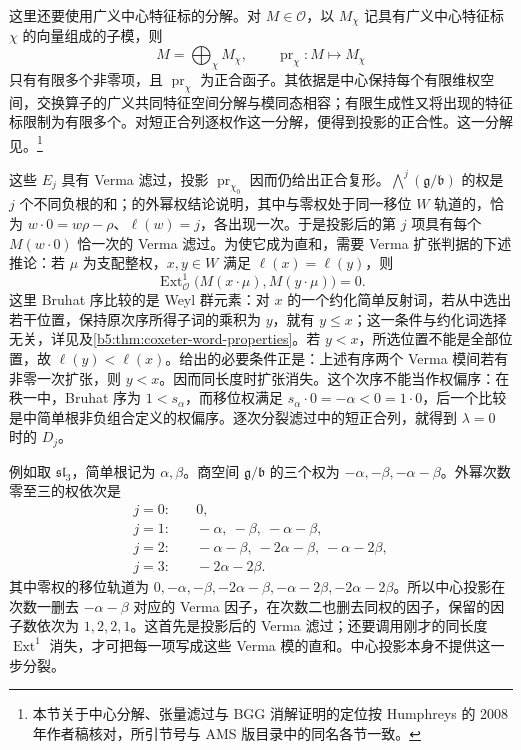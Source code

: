 \begin{proofsketch}
	这里还要使用广义中心特征标的分解。对 \(M\in\mathcal O\)，以 \(M_\chi\) 记具有广义中心特征标 \(\chi\) 的向量组成的子模，则
	\[
		M=\bigoplus_\chi M_\chi, \qquad \operatorname{pr}_\chi:M\longmapsto M_\chi
	\]
	只有有限多个非零项，且 \(\operatorname{pr}_\chi\) 为正合函子。其依据是中心保持每个有限维权空间，交换算子的广义共同特征空间分解与模同态相容；有限生成性又将出现的特征标限制为有限多个。对短正合列逐权作这一分解，便得到投影的正合性。这一分解见\cite[Section 1.12]{Humphreys2008BGGCategoryO}。\footnote{本节关于中心分解、张量滤过与 BGG 消解证明的定位按 Humphreys 的 2008 年作者稿核对，所引节号与 AMS 版目录中的同名各节一致。}

	这些 \(E_j\) 具有 Verma 滤过，投影 \(\operatorname{pr}_{\chi_0}\) 因而仍给出正合复形。\(\bigwedge^j(\mathfrak g/\mathfrak b)\) 的权是 \(j\) 个不同负根的和；\cite[Section 6.4]{Humphreys2008BGGCategoryO}的外幂权结论说明，其中与零权处于同一移位 \(W\) 轨道的，恰为 \(w\mathbin{\cdot}0=w\rho-\rho\)、\(\ell(w)=j\)，各出现一次。于是投影后的第 \(j\) 项具有每个 \(M(w\mathbin{\cdot}0)\) 恰一次的 Verma 滤过。为使它成为直和，需要 Verma 扩张判据的下述推论：若 \(\mu\) 为支配整权，\(x,y\in W\) 满足 \(\ell(x)=\ell(y)\)，则
	\[
		\operatorname{Ext}^1_{\mathcal O} \bigl(M(x\mathbin{\cdot}\mu),M(y\mathbin{\cdot}\mu)\bigr)=0.
	\]
	这里 Bruhat 序比较的是 Weyl 群元素：对 \(x\) 的一个约化简单反射词，若从中选出若干位置，保持原次序所得子词的乘积为 \(y\)，就有 \(y\le x\)；这一条件与约化词选择无关，详见及\cref{b5:thm:coxeter-word-properties}。若 \(y<x\)，所选位置不能是全部位置，故 \(\ell(y)<\ell(x)\)。\cite[Section 6.5, Theorem (b)]{Humphreys2008BGGCategoryO}给出的必要条件正是：上述有序两个 Verma 模间若有非零一次扩张，则 \(y<x\)。因而同长度时扩张消失。这个次序不能当作权偏序：在秩一中，Bruhat 序为 \(1<s_\alpha\)，而移位权满足 \(s_\alpha\mathbin{\cdot}0=-\alpha<0=1\mathbin{\cdot}0\)，后一个比较是中简单根非负组合定义的权偏序。逐次分裂滤过中的短正合列，就得到 \(\lambda=0\) 时的 \(D_j\)。

	例如取 \(\mathfrak{sl}_3\)，简单根记为 \(\alpha,\beta\)。商空间 \(\mathfrak g/\mathfrak b\) 的三个权为 \(-\alpha,-\beta,-\alpha-\beta\)。外幂次数零至三的权依次是
	\[
		\begin{aligned}
			j=0:&\quad 0,\\
			j=1:&\quad-\alpha,\ -\beta,\ -\alpha-\beta,\\
			j=2:&\quad-\alpha-\beta,\ -2\alpha-\beta,\ -\alpha-2\beta,\\
			j=3:&\quad-2\alpha-2\beta.
		\end{aligned}
	\]
	其中零权的移位轨道为 \(0,-\alpha,-\beta,-2\alpha-\beta,-\alpha-2\beta,-2\alpha-2\beta\)。所以中心投影在次数一删去 \(-\alpha-\beta\) 对应的 Verma 因子，在次数二也删去同权的因子，保留的因子数依次为 \(1,2,2,1\)。这首先是投影后的 Verma 滤过；还要调用刚才的同长度 \(\operatorname{Ext}^1\) 消失，才可把每一项写成这些 Verma 模的直和。中心投影本身不提供这一步分裂。


\end{proofsketch}
